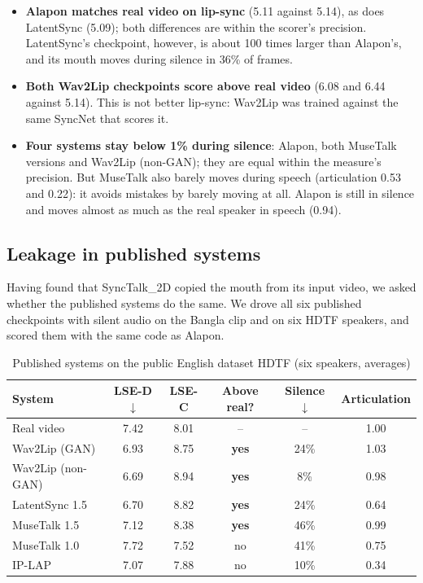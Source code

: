 \begin{itemize}
    \item \textbf{Alapon matches real video on lip-sync} (5.11 against 5.14), as does LatentSync (5.09); both differences are within the scorer's precision. LatentSync's checkpoint, however, is about 100 times larger than Alapon's, and its mouth moves during silence in 36\% of frames.
    \item \textbf{Both Wav2Lip checkpoints score above real video} (6.08 and 6.44 against 5.14). This is not better lip-sync: Wav2Lip was trained against the same SyncNet that scores it.
    \item \textbf{Four systems stay below 1\% during silence}: Alapon, both MuseTalk versions and Wav2Lip (non-GAN); they are equal within the measure's precision. But MuseTalk also barely moves during speech (articulation 0.53 and 0.22): it avoids mistakes by barely moving at all. Alapon is still in silence and moves almost as much as the real speaker in speech (0.94).
\end{itemize}

\subsection{Leakage in published systems}
\label{sec:leakage}

Having found that SyncTalk\_2D copied the mouth from its input video, we asked whether the published systems do the same. We drove all six published checkpoints with silent audio on the Bangla clip and on six HDTF speakers, and scored them with the same code as Alapon.

\begin{table}[H]
    \centering
    \caption{Published systems on the public English dataset HDTF (six speakers, averages)}
    \label{tab:hdtf}
    \renewcommand{\arraystretch}{1.3}
    \begin{tabular}{lccccc}
        \hline
        \textbf{System} & \textbf{LSE-D $\downarrow$} & \textbf{LSE-C} & \textbf{Above real?} & \textbf{Silence $\downarrow$} & \textbf{Articulation} \\
        \hline
        Real video & 7.42 & 8.01 & -- & -- & 1.00 \\
        Wav2Lip (GAN) & 6.93 & 8.75 & \textbf{yes} & 24\% & 1.03 \\
        Wav2Lip (non-GAN) & 6.69 & 8.94 & \textbf{yes} & 8\% & 0.98 \\
        LatentSync 1.5 & 6.70 & 8.82 & \textbf{yes} & 24\% & 0.64 \\
        MuseTalk 1.5 & 7.12 & 8.38 & \textbf{yes} & 46\% & 0.99 \\
        MuseTalk 1.0 & 7.72 & 7.52 & no & 41\% & 0.75 \\
        IP-LAP & 7.07 & 7.88 & no & 10\% & 0.34 \\
        \hline
    \end{tabular}
\end{table}

